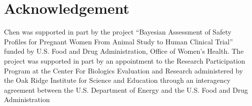 
\section*{Acknowledgement}

Chen was supported in part by the project
``Bayesian Assessment of Safety Profiles for Pregnant Women From Animal
Study to Human Clinical Trial'' funded by U.S. Food and Drug Administration,
Office of Women's Health. The project was supported
in part by an appointment to the Research Participation Program at the
Center For Biologics Evaluation and Research administered by the Oak Ridge
Institute for Science and Education through an interagency agreement between
the U.S. Department of Energy and the U.S. Food and Drug Administration
\\

